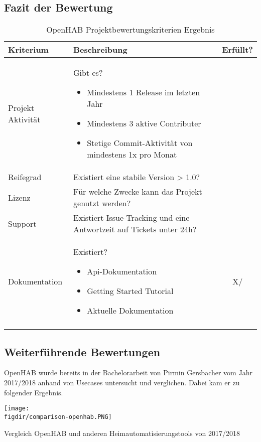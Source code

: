 \subsection{Fazit der Bewertung}
\begin{longtable}{| p{3cm} | p{10cm}| c |}
	\hline
	\textbf{Kriterium} & \textbf{Beschreibung} & \textbf{Erfüllt?} \\
	\hline \hline
	\centering Projekt Aktivität & Gibt es?
	\begin{itemize}
		\item Mindestens 1 Release im letzten Jahr
		\item Mindestens 3 aktive Contributer
		\item Stetige Commit-Aktivität von mindestens 1x pro Monat
	\end{itemize} & \checkmark \\
	\hline
	\centering Reifegrad & Existiert eine stabile Version > 1.0? & \checkmark \\
	\hline
	\centering Lizenz & Für welche Zwecke kann das Projekt genutzt werden? & \checkmark \\
	\hline
	\centering Support & Existiert Issue-Tracking und eine Antwortzeit auf Tickets unter 24h? & \checkmark \\
	\hline
	\centering Dokumentation & Existiert?
	\begin{itemize}
		\item Api-Dokumentation
		\item Getting Started Tutorial
		\item Aktuelle Dokumentation
	\end{itemize} & X/\checkmark \\
	\hline
	\caption{OpenHAB Projektbewertungskriterien Ergebnis}
	\label{table:openhab-judgement-criteria-result}
\end{longtable}

\subsection{Weiterführende Bewertungen}
OpenHAB wurde bereits in der Bachelorarbeit von Pirmin Gersbacher vom Jahr 2017/2018 anhand von Usecases untersucht und verglichen. Dabei kam er zu folgender Ergebnis.

\begin{minipage}{\textwidth}
	\centering
	\captionsetup{type=figure}
	\texttt{[image: \\figdir/comparison-openhab.PNG]}
	\caption{Vergleich OpenHAB und anderen Heimautomatisierungstools von 2017/2018 \label{fig:comparison-openhab}}
\end{minipage}

